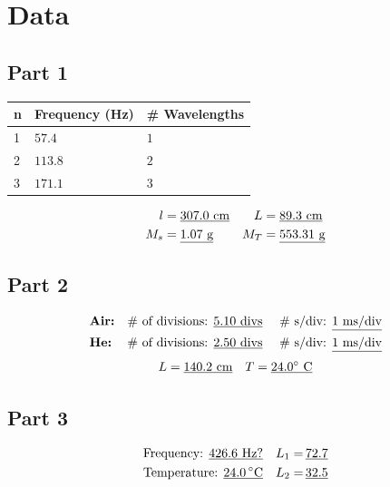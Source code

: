 \documentclass[twocolumn,english]{IEEEtran}
\theoremstyle{plain}
\theoremstyle{plain}
\begin{document}
\section{Data}
  \subsection*{\textbf{Part 1}}
  \begin{table}[h]
  \centering{}
  \begin{tabular}{|l|l|l|}
  \hline
  n & Frequency (Hz)		& \# Wavelengths 	\\ \hline
  1 & $57.4$	            	& $1$                	\\ \hline
  2 & $113.8$               	& $2$               	\\ \hline
  3 & $171.1$               	& $3$              	\\ \hline
  \end{tabular}
  \end{table}

  \begin{align*}
   l   &= \text{\underline{$307.0$ cm}}	&	L&= \text{\underline{$89.3$ cm}} \\
   M_s &= \text{\underline{$1.07$ g}} 	&	M_T&= \text{\underline{$553.31$ g}}
  \end{align*}

  \subsection*{\textbf{Part 2}}
  \begin{align*}
   &\text{\textbf{Air:}}	&\text{\# of divisions: } &\text{\underline{$5.10$ divs} }	& &\text{\# s/div: \underline{$1$ ms/div}} \\
   &\text{\textbf{He:}}		&\text{\# of divisions: } &\text{\underline{$2.50$ divs} }		& &\text{\# s/div: \underline{$1$ ms/div}}
  \end{align*}
  \begin{align*}
   &L = \text{\underline{$140.2$ cm}}	&T = \text{\underline{$24.0^{\circ}$ C}}
  \end{align*}


  \subsection*{\textbf{Part 3}}
  \begin{align*}
   &\text{Frequency: \underline{$426.6$ Hz?}} 			&\text{$L_1 =\,$\underline{$72.7$}} \\
   &\text{Temperature: \underline{$24.0\,^{\circ}$C}}		&\text{$L_2 =\,$\underline{$32.5$}}
  \end{align*}
\end{document}
